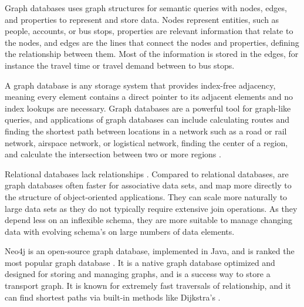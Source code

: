 Graph databases uses graph structures for semantic queries with nodes, edges, and properties to represent and store data.
Nodes represent entities, such as people, accounts, or bus stops, properties are relevant information that relate to the nodes, and edges are the lines that connect the nodes and properties, defining the relationship between them. Most of the information is stored in the edges, for instance the travel time or travel demand between to bus stops. 

A graph database is any storage system that provides index-free adjacency, meaning every element contains a direct pointer to its adjacent elements and no index lookups are necessary. Graph databases are a powerful tool for graph-like queries, and applications of graph databases can include calculating routes and finding the shortest path between locations in a network such as a road or rail network, airspace network, or logistical network, finding the center of a region, and calculate the intersection between two or more regions \citep{robinson13}.


Relational databases lack relationships \citep{robinson13}. Compared to relational databases, are graph databases often faster for associative data sets, and map more directly to the structure of object-oriented applications. They can scale more naturally to large data sets as they do not typically require extensive join operations. As they depend less on an inflexible schema, they are more suitable to manage changing data with evolving schema's on large numbers of data elements.

Neo4j \citep{website:neo4j} is an open-source graph database, implemented in Java, and is ranked the most popular graph database \citep{website:graphdbranking}. It is a native graph database optimized and designed for storing and managing graphs, and is a success way to store a transport graph. It is known for extremely fast traversals of relationship, and it can find shortest paths via built-in methods like Dijkstra's \citep{robinson13}. 



